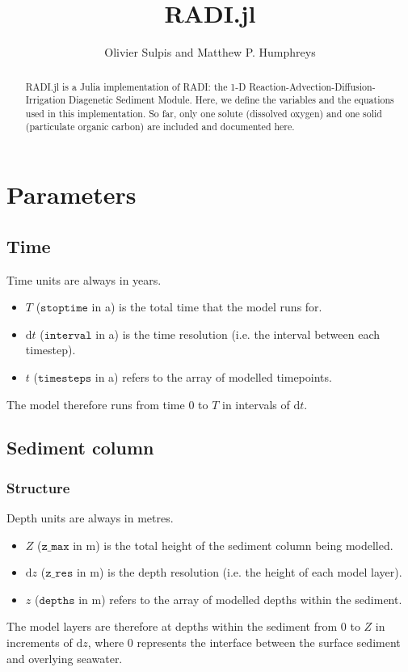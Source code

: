 \documentclass[a4paper]{article}
\newcommand{\D}[1]{\mathrm{d}#1}
\newcommand{\code}[1]{\texttt{#1}}
\begin{document}
\title{RADI.jl}
\author{Olivier Sulpis and Matthew P. Humphreys}

\maketitle

\begin{abstract}
RADI.jl is a Julia implementation of RADI: the 1-D Reaction-Advection-Diffusion-Irrigation Diagenetic Sediment Module. Here, we define the variables and the equations used in this implementation. So far, only one solute (dissolved oxygen) and one solid (particulate organic carbon) are included and documented here.
\end{abstract}

\section{Parameters}

\subsection{Time}

Time units are always in years.
\begin{itemize}
  \item $T$ ($\code{stoptime}$ in a) is the total time that the model runs for.
  \item $\D{t}$ ($\code{interval}$ in a) is the time resolution (i.e. the interval between each timestep).
  \item $t$ ($\code{timesteps}$ in a) refers to the array of modelled timepoints.
\end{itemize}
The model therefore runs from time $0$ to $T$ in intervals of $\D{t}$.

\subsection{Sediment column}

\subsubsection{Structure}

Depth units are always in metres.
\begin{itemize}
  \item $Z$ ($\code{z\_max}$ in m) is the total height of the sediment column being modelled.
  \item $\D{z}$ ($\code{z\_res}$ in m) is the depth resolution (i.e. the height of each model layer).
  \item $z$ ($\code{depths}$ in m) refers to the array of modelled depths within the sediment.
\end{itemize}
The model layers are therefore at depths within the sediment from $0$ to $Z$ in increments of $\D{z}$, where $0$ represents the interface between the surface sediment and overlying seawater.
\end{document}

